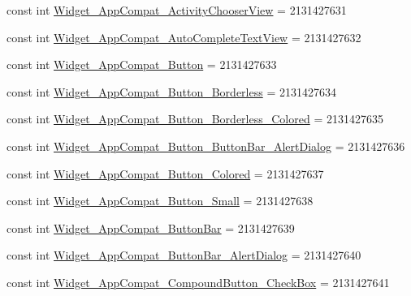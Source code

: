 \begin{DoxyCompactItemize}
const int \mbox{\hyperlink{class_f_w_p_s___app_1_1_droid_1_1_resource_1_1_style_a766ff2380f16bd0088df27598c30b128}{Widget\+\_\+\+App\+Compat\+\_\+\+Activity\+Chooser\+View}} = 2131427631
\item 
const int \mbox{\hyperlink{class_f_w_p_s___app_1_1_droid_1_1_resource_1_1_style_ac131edeb3f2523edf970f94daf53fd58}{Widget\+\_\+\+App\+Compat\+\_\+\+Auto\+Complete\+Text\+View}} = 2131427632
\item 
const int \mbox{\hyperlink{class_f_w_p_s___app_1_1_droid_1_1_resource_1_1_style_aa525078e1a918dd96c003b399fe3955e}{Widget\+\_\+\+App\+Compat\+\_\+\+Button}} = 2131427633
\item 
const int \mbox{\hyperlink{class_f_w_p_s___app_1_1_droid_1_1_resource_1_1_style_a8c2316358d0f66985ec369a082efa0e3}{Widget\+\_\+\+App\+Compat\+\_\+\+Button\+\_\+\+Borderless}} = 2131427634
\item 
const int \mbox{\hyperlink{class_f_w_p_s___app_1_1_droid_1_1_resource_1_1_style_a58c286f770455a97507d1d5933bca0bc}{Widget\+\_\+\+App\+Compat\+\_\+\+Button\+\_\+\+Borderless\+\_\+\+Colored}} = 2131427635
\item 
const int \mbox{\hyperlink{class_f_w_p_s___app_1_1_droid_1_1_resource_1_1_style_a3f8bb2eece9ee755685ead843af0d566}{Widget\+\_\+\+App\+Compat\+\_\+\+Button\+\_\+\+Button\+Bar\+\_\+\+Alert\+Dialog}} = 2131427636
\item 
const int \mbox{\hyperlink{class_f_w_p_s___app_1_1_droid_1_1_resource_1_1_style_ad79faaf26bf26b534b219c03813cb0d1}{Widget\+\_\+\+App\+Compat\+\_\+\+Button\+\_\+\+Colored}} = 2131427637
\item 
const int \mbox{\hyperlink{class_f_w_p_s___app_1_1_droid_1_1_resource_1_1_style_abd5c97a067f535b1acb456a66babf1f6}{Widget\+\_\+\+App\+Compat\+\_\+\+Button\+\_\+\+Small}} = 2131427638
\item 
const int \mbox{\hyperlink{class_f_w_p_s___app_1_1_droid_1_1_resource_1_1_style_a9f2cca6cee668aa4c3631942a6c720f2}{Widget\+\_\+\+App\+Compat\+\_\+\+Button\+Bar}} = 2131427639
\item 
const int \mbox{\hyperlink{class_f_w_p_s___app_1_1_droid_1_1_resource_1_1_style_aa2194c55eae46dfe6b8947662f614d04}{Widget\+\_\+\+App\+Compat\+\_\+\+Button\+Bar\+\_\+\+Alert\+Dialog}} = 2131427640
\item 
const int \mbox{\hyperlink{class_f_w_p_s___app_1_1_droid_1_1_resource_1_1_style_a498d3726a67474d52c6f615b53e077db}{Widget\+\_\+\+App\+Compat\+\_\+\+Compound\+Button\+\_\+\+Check\+Box}} = 2131427641
\item 

\end{DoxyCompactItemize}
